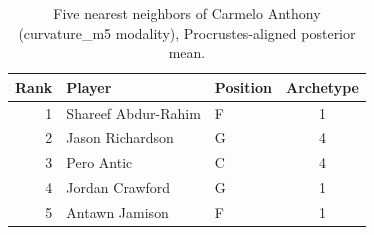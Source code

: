 \begin{table}[htbp]
  \centering\small
  \begin{tabular}{rllc}
    \toprule
    Rank & Player & Position & Archetype \\
    \midrule
    1 & Shareef Abdur-Rahim & F & 1 \\
    2 & Jason Richardson & G & 4 \\
    3 & Pero Antic & C & 4 \\
    4 & Jordan Crawford & G & 1 \\
    5 & Antawn Jamison & F & 1 \\
    \bottomrule
  \end{tabular}
  \caption{Five nearest neighbors of Carmelo Anthony (curvature_m5 modality), Procrustes-aligned posterior mean.}
  \label{tab:Carmelo_Anthony_neighbors_curvature_m5}
\end{table}

